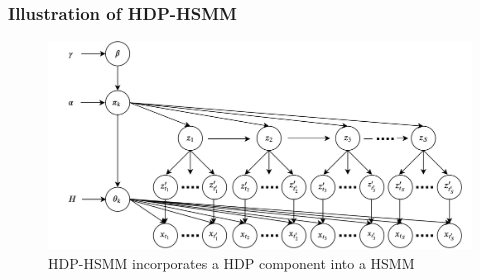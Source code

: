 \documentclass{beamer}
\begin{document}
\begin{frame}
    \frametitle{Illustration of HDP-HSMM}
    \begin{figure}[H]
    \centering
    \includegraphics[scale=0.12]{images/hdphsmm.png}
    \caption{HDP-HSMM incorporates a HDP component into a HSMM}
    \label{fig:hdphsmm}
    \end{figure}
\end{frame}
\end{document}
